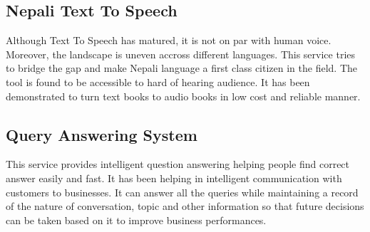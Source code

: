 \documentclass[12pt,a4paper]{scrreprt}
\begin{document}
  \subsection{Nepali Text To Speech}
  Although Text To Speech has matured, it is not on par with human voice. Moreover, the landscape is uneven accross different languages.
  This service tries to bridge the gap and make Nepali language a first class citizen in the field. The tool is found to be accessible to 
  hard of hearing audience. It has been demonstrated to turn text books to audio books in low cost and reliable manner.
  
  \subsection{Query Answering System}
  This service provides intelligent question answering helping people find correct answer easily and fast.
  It has been helping in intelligent communication with customers to businesses. It can answer all the queries while maintaining a record of the nature
  of conversation, topic and other information so that future decisions can be taken
  based on it to improve business performances. 
\end{document}

